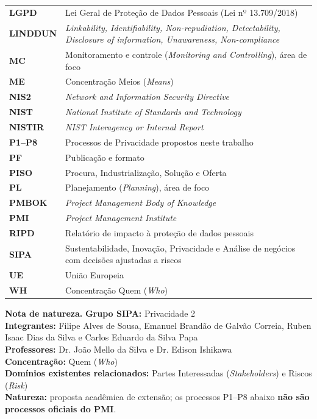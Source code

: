 \documentclass[12pt,a4paper,article,oneside,english,brazil]{abntex2}
\begin{document}
\begin{longtable}{@{}>{\raggedright\arraybackslash}p{2.6cm}>{\raggedright\arraybackslash}p{\dimexpr\linewidth-2.6cm-2\tabcolsep\relax}@{}}
\textbf{LGPD} & Lei Geral de Proteção de Dados Pessoais (Lei nº 13.709/2018)\\[2pt]
\textbf{LINDDUN} & \textit{Linkability, Identifiability, Non-repudiation, Detectability, Disclosure of information, Unawareness, Non-compliance}\\[2pt]
\textbf{MC} & Monitoramento e controle (\textit{Monitoring and Controlling}), área de foco\\[2pt]
\textbf{ME} & Concentração Meios (\textit{Means})\\[2pt]
\textbf{NIS2} & \textit{Network and Information Security Directive}\\[2pt]
\textbf{NIST} & \textit{National Institute of Standards and Technology}\\[2pt]
\textbf{NISTIR} & \textit{NIST Interagency or Internal Report}\\[2pt]
\textbf{P1--P8} & Processos de Privacidade propostos neste trabalho\\[2pt]
\textbf{PF} & Publicação e formato\\[2pt]
\textbf{PISO} & Procura, Industrialização, Solução e Oferta\\[2pt]
\textbf{PL} & Planejamento (\textit{Planning}), área de foco\\[2pt]
\textbf{PMBOK} & \textit{Project Management Body of Knowledge}\\[2pt]
\textbf{PMI} & \textit{Project Management Institute}\\[2pt]
\textbf{RIPD} & Relatório de impacto à proteção de dados pessoais\\[2pt]
\textbf{SIPA} & Sustentabilidade, Inovação, Privacidade e Análise de negócios com decisões ajustadas a riscos\\[2pt]
\textbf{UE} & União Europeia\\[2pt]
\textbf{WH} & Concentração Quem (\textit{Who})\\[2pt]
\end{longtable}
\endgroup
\clearpage

\begin{flushleft}\small\SingleSpacing
\noindent\textbf{Nota de natureza.} \textbf{Grupo SIPA:} Privacidade 2\\ \textbf{Integrantes:} Filipe Alves de Sousa, Emanuel Brandão de Galvão Correia, Ruben Isaac Dias da Silva e Carlos Eduardo da Silva Papa\\ \textbf{Professores:} Dr. João Mello da Silva e Dr. Edison Ishikawa\\ \textbf{Concentração:} Quem (\textit{Who})\\ \textbf{Domínios existentes relacionados:} Partes Interessadas (\textit{Stakeholders}) e Riscos (\textit{Risk})\\ \textbf{Natureza:} proposta acadêmica de extensão; os processos P1–P8 abaixo \textbf{não são processos oficiais do PMI}.
\end{flushleft}
\vspace{\onelineskip}
\end{document}
